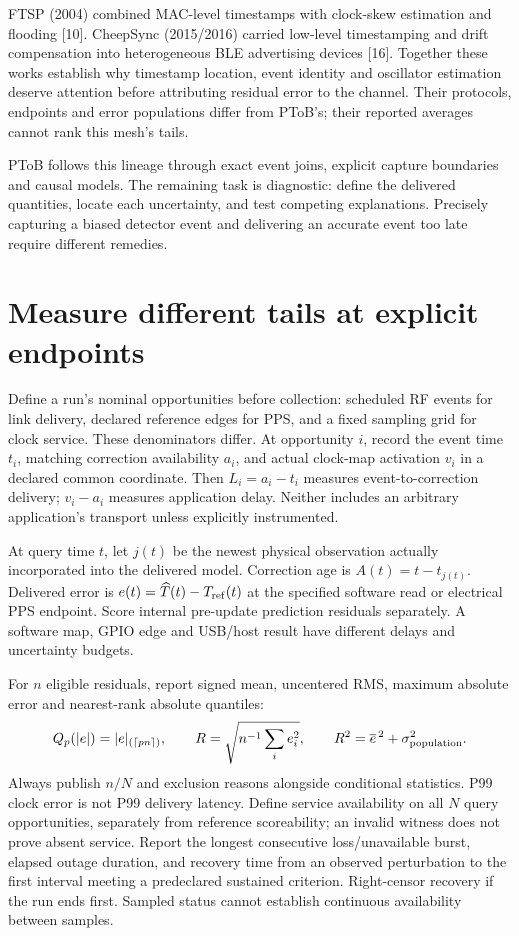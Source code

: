 \documentclass[11pt,letterpaper]{article}
\begin{document}
FTSP (2004) combined MAC-level timestamps with clock-skew estimation and flooding [10]. CheepSync (2015/2016) carried low-level timestamping and drift compensation into heterogeneous BLE advertising devices [16]. Together these works establish why timestamp location, event identity and oscillator estimation deserve attention before attributing residual error to the channel. Their protocols, endpoints and error populations differ from PToB's; their reported averages cannot rank this mesh's tails.

PToB follows this lineage through exact event joins, explicit capture boundaries and causal models. The remaining task is diagnostic: define the delivered quantities, locate each uncertainty, and test competing explanations. Precisely capturing a biased detector event and delivering an accurate event too late require different remedies.
\newpage
\section{Measure different tails at explicit endpoints}
Define a run's nominal opportunities before collection: scheduled RF events for link delivery, declared reference edges for PPS, and a fixed sampling grid for clock service. These denominators differ. At opportunity $i$, record the event time $t_i$, matching correction availability $a_i$, and actual clock-map activation $v_i$ in a declared common coordinate. Then $L_i=a_i-t_i$ measures event-to-correction delivery; $v_i-a_i$ measures application delay. Neither includes an arbitrary application's transport unless explicitly instrumented.

At query time $t$, let $j(t)$ be the newest physical observation actually incorporated into the delivered model. Correction age is $A(t)=t-t_{j(t)}$. Delivered error is $e(t)=\widehat T(t)-T_{\rm ref}(t)$ at the specified software read or electrical PPS endpoint. Score internal pre-update prediction residuals separately. A software map, GPIO edge and USB/host result have different delays and uncertainty budgets.

For $n$ eligible residuals, report signed mean, uncentered RMS, maximum absolute error and nearest-rank absolute quantiles:
\[
 Q_p(|e|)=|e|_{(\lceil pn\rceil)},\qquad
 R=\sqrt{n^{-1}\sum_i e_i^2},\qquad R^2=\overline e^{\,2}+\sigma_{\rm population}^2.
\]
Always publish $n/N$ and exclusion reasons alongside conditional statistics. P99 clock error is not P99 delivery latency. Define service availability on all $N$ query opportunities, separately from reference scoreability; an invalid witness does not prove absent service. Report the longest consecutive loss/unavailable burst, elapsed outage duration, and recovery time from an observed perturbation to the first interval meeting a predeclared sustained criterion. Right-censor recovery if the run ends first. Sampled status cannot establish continuous availability between samples.
\end{document}
